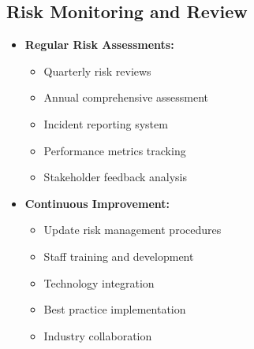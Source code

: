 \subsection{Risk Monitoring and Review}
\begin{itemize}
    \item \textbf{Regular Risk Assessments:}
    \begin{itemize}
        \item Quarterly risk reviews
        \item Annual comprehensive assessment
        \item Incident reporting system
        \item Performance metrics tracking
        \item Stakeholder feedback analysis
    \end{itemize}
    
    \item \textbf{Continuous Improvement:}
    \begin{itemize}
        \item Update risk management procedures
        \item Staff training and development
        \item Technology integration
        \item Best practice implementation
        \item Industry collaboration
    \end{itemize}
\end{itemize}
